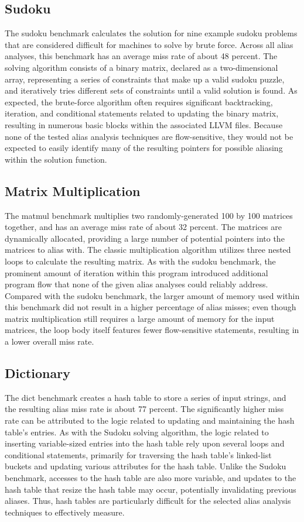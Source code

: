 \subsection{Sudoku}
The sudoku benchmark calculates the solution for nine example sudoku problems that are considered difficult for machines to solve by brute force. Across all alias analyses, this benchmark has an average miss rate of about 48 percent. The solving algorithm consists of a binary matrix, declared as a two-dimensional array, representing a series of constraints that make up a valid sudoku puzzle, and iteratively tries different sets of constraints until a valid solution is found. As expected, the brute-force algorithm often requires significant backtracking, iteration, and conditional statements related to updating the binary matrix, resulting in numerous basic blocks within the associated LLVM files. Because none of the tested alias analysis techniques are flow-sensitive, they would not be expected to easily identify many of the resulting pointers for possible aliasing within the solution function.

\subsection{Matrix Multiplication}
The matmul benchmark multiplies two randomly-generated 100 by 100 matrices together, and has an average miss rate of about 32 percent. The matrices are dynamically allocated, providing a large number of potential pointers into the matrices to alias with. The classic multiplication algorithm utilizes three nested loops to calculate the resulting matrix. As with the sudoku benchmark, the prominent amount of iteration within this program introduced additional program flow that none of the given alias analyses could reliably address. Compared with the sudoku benchmark, the larger amount of memory used within this benchmark did not result in a higher percentage of alias misses; even though matrix multiplication still requires a large amount of memory for the input matrices, the loop body itself features fewer flow-sensitive statements, resulting in a lower overall miss rate.

\subsection{Dictionary}
The dict benchmark creates a hash table to store a series of input strings, and the resulting alias miss rate is about 77 percent. The significantly higher miss rate can be attributed to the logic related to updating and maintaining the hash table's entries. As with the Sudoku solving algorithm, the logic related to inserting variable-sized entries into the hash table rely upon several loops and conditional statements, primarily for traversing the hash table's linked-list buckets and updating various attributes for the hash table. Unlike the Sudoku benchmark, accesses to the hash table are also more variable, and updates to the hash table that resize the hash table may occur, potentially invalidating previous aliases. Thus, hash tables are particularly difficult for the selected alias analysis techniques to effectively measure.

